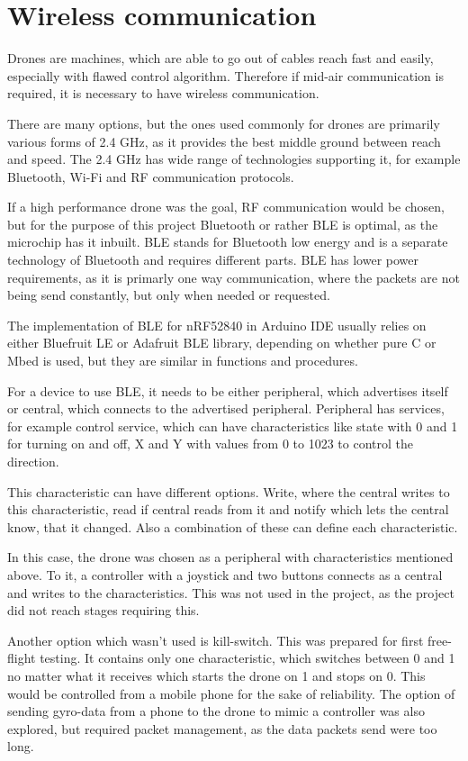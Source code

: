 \section{Wireless communication}
Drones are machines, which are able to go out of cables reach fast and easily, especially with flawed control algorithm. Therefore if mid-air communication is required, it is necessary to have wireless communication.

There are many options, but the ones used commonly for drones are primarily various forms of 2.4 GHz, as it provides the best middle ground between reach and speed. The 2.4 GHz has wide range of technologies supporting it, for example Bluetooth, Wi-Fi and RF communication protocols. 

If a high performance drone was the goal, RF communication would be chosen, but for the purpose of this project Bluetooth or rather BLE is optimal, as the microchip has it inbuilt. BLE stands for Bluetooth low energy and is a separate technology of Bluetooth and requires different parts. BLE has lower power requirements, as it is primarly one way communication, where the packets are not being send constantly, but only when needed or requested.

The implementation of BLE for nRF52840 in Arduino IDE usually relies on either Bluefruit LE or Adafruit BLE library, depending on whether pure C or Mbed is used, but they are similar in functions and procedures.

For a device to use BLE, it needs to be either peripheral, which advertises itself or central, which connects to the advertised peripheral. Peripheral has services, for example control service, which can have characteristics like state with 0 and 1 for turning on and off, X and Y with values from 0 to 1023 to control the direction.

This characteristic can have different options. Write, where the central writes to this characteristic, read if central reads from it and notify which lets the central know, that it changed. Also a combination of these can define each characteristic.

In this case, the drone was chosen as a peripheral with characteristics mentioned above. To it, a controller with a joystick and two buttons connects as a central and writes to the characteristics. This was not used in the project, as the project did not reach stages requiring this.

Another option which wasn't used is kill-switch. This was prepared for first free-flight testing. It contains only one characteristic, which switches between 0 and 1 no matter what it receives which starts the drone on 1 and stops on 0. This would be controlled from a mobile phone for the sake of reliability. The option of sending gyro-data from a phone to the drone to mimic a controller was also explored, but required packet management, as the data packets send were too long.

